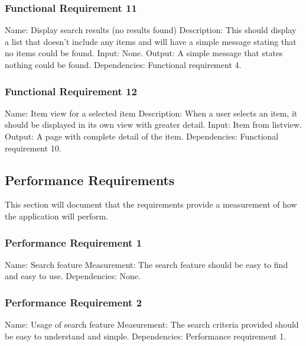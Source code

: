 \documentclass[journal,compsoc, 10pt, draftclsnofoot, onecolumn]{IEEEtran}
\begin{document}
\subsubsection{Functional Requirement 11}
Name: Display search results (no results found)\newline
Description: This should display a list that doesn't include any items and will 
have a simple message stating that no items could be found. \newline
Input: None.\newline
Output: A simple message that states nothing could be found.\newline
Dependencies: Functional requirement 4.

\subsubsection{Functional Requirement 12}
Name: Item view for a selected item\newline
Description: When a user selects an item, it should be displayed in its own view
 with greater detail.\newline
Input: Item from listview.\newline
Output: A page with complete detail of the item.\newline
Dependencies: Functional requirement 10.

\subsection{Performance Requirements}

This section will document that the requirements provide a measurement of how 
the application will perform.

\subsubsection{Performance Requirement 1}
Name: Search feature\newline
Measurement: The search feature should be easy to find and easy to use.\newline
Dependencies: None.

\subsubsection{Performance Requirement 2}
Name: Usage of search feature\newline
Measurement: The search criteria provided should be easy to understand and 
simple.\newline
Dependencies: Performance requirement 1.
\end{document}

